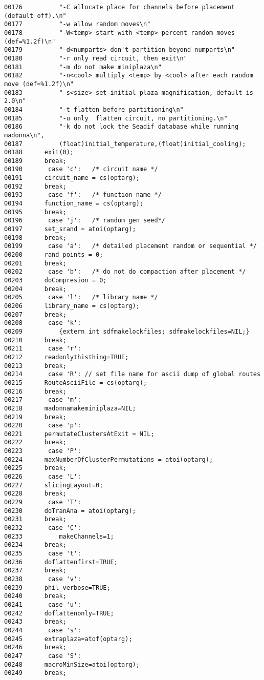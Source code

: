 \begin{verbatim}
00176          "-C allocate place for channels before placement (default off).\n"
00177          "-w allow random moves\n"
00178          "-W<temp> start with <temp> percent random moves (def=%1.2f)\n"
00179          "-d<numparts> don't partition beyond numparts\n"
00180          "-r only read circuit, then exit\n"
00181          "-m do not make miniplaza\n"
00182          "-n<cool> multiply <temp> by <cool> after each random move (def=%1.2f)\n"
00183          "-s<size> set initial plaza magnification, default is 2.0\n"
00184          "-t flatten before partitioning\n"
00185          "-u only  flatten circuit, no partitioning.\n"
00186          "-k do not lock the Seadif database while running madonna\n",
00187          (float)initial_temperature,(float)initial_cooling);
00188      exit(0);
00189      break;
00190       case 'c':   /* circuit name */
00191      circuit_name = cs(optarg);
00192      break;
00193       case 'f':   /* function name */
00194      function_name = cs(optarg);
00195      break;
00196       case 'j':   /* random gen seed*/
00197      set_srand = atoi(optarg);
00198      break;
00199       case 'a':   /* detailed placement random or sequential */
00200      rand_points = 0;
00201      break;
00202       case 'b':   /* do not do compaction after placement */
00203      doCompresion = 0;
00204      break;
00205       case 'l':   /* library name */
00206      library_name = cs(optarg);
00207      break;
00208       case 'k':
00209          {extern int sdfmakelockfiles; sdfmakelockfiles=NIL;}
00210      break;
00211       case 'r':
00212      readonlythisthing=TRUE;
00213      break;
00214       case 'R': // set file name for ascii dump of global routes
00215      RouteAsciiFile = cs(optarg);
00216      break;
00217       case 'm':
00218      madonnamakeminiplaza=NIL;
00219      break;
00220       case 'p':
00221      permutateClustersAtExit = NIL;
00222      break;
00223       case 'P':
00224      maxNumberOfClusterPermutations = atoi(optarg);
00225      break;
00226       case 'L':
00227      slicingLayout=0;
00228      break;
00229       case 'T':
00230      doTranAna = atoi(optarg);
00231      break;
00232       case 'C':
00233          makeChannels=1;
00234      break;
00235       case 't':
00236      doflattenfirst=TRUE;
00237      break;
00238       case 'v':
00239      phil_verbose=TRUE;
00240      break;
00241       case 'u':
00242      doflattenonly=TRUE;
00243      break;
00244       case 's':
00245      extraplaza=atof(optarg);
00246      break;
00247       case 'S':
00248      macroMinSize=atoi(optarg);
00249      break;

\end{verbatim}
